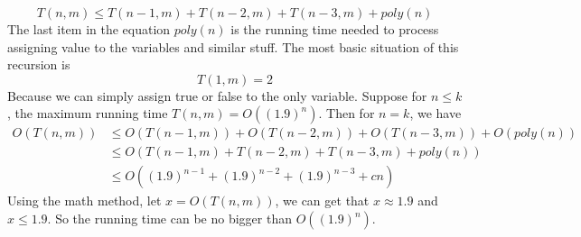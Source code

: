 \documentclass{article}
\begin{document}
\begin{enumerate}
			\begin{displaymath}
				T(n, m) \leq T(n - 1, m) + T(n - 2, m) + T(n - 3, m) + poly(n)
			\end{displaymath}
			The last item in the equation $poly(n)$ is the running time needed to process assigning value to the variables and similar stuff. The most basic situation of this recursion is \begin{displaymath}
			T(1, m) = 2
			\end{displaymath}
			Because we can simply assign true or false to the only variable.
			Suppose for $n \leq k$, the maximum running time $T(n, m) = O((1.9)^n)$. Then for $n = k$, we have \begin{equation}
			\begin{split}
			O(T(n, m)) & \leq  O(T(n - 1, m)) + O(T(n - 2, m)) + O(T(n - 3, m)) + O(poly(n)) \\
					& \leq  O(T(n - 1, m) + T(n - 2, m) + T(n - 3, m) + poly(n)) \\
					& \leq  O((1.9)^{n - 1} + (1.9)^{n - 2} + (1.9)^{n - 3} + cn)
			\end{split}
			\end{equation}
			Using the math method, let $x = O(T(n, m))$, we can get that $x \approx 1.9$ and $x \le 1.9$. So the running time can be no bigger than $O((1.9)^n)$.
		\end{enumerate}
\end{document}
